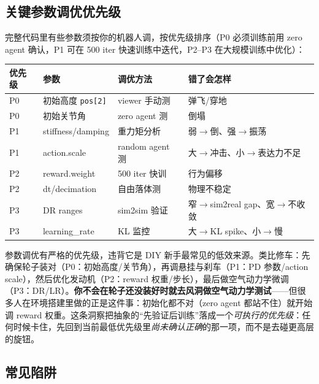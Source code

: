 \subsection{关键参数调优优先级}
\label{sec:rlmc-diy-tuning}

完整代码里有些参数须按你的机器人调，按优先级排序（P0 必须训练前用 zero agent 确认，P1 可在 500 iter 快速训练中迭代，P2--P3 在大规模训练中优化）：

\begin{center}
\small
\begin{tabular}{@{}llp{3.4cm}p{3.6cm}@{}}
\toprule
优先级 & 参数 & 调优方法 & 错了会怎样 \\
\midrule
P0 & 初始高度 \verb|pos[2]| & viewer 手动测 & 弹飞/穿地 \\
P0 & 初始关节角 & zero agent 测 & 倒塌 \\
P1 & stiffness/damping & 重力矩分析 & 弱$\to$倒、强$\to$振荡 \\
P1 & action.scale & random agent 测 & 大$\to$冲击、小$\to$表达力不足 \\
P2 & reward.weight & 500 iter 快训 & 行为偏移 \\
P2 & dt/decimation & 自由落体测 & 物理不稳定 \\
P3 & DR ranges & sim2sim 验证 & 窄$\to$sim2real gap、宽$\to$不收敛 \\
P3 & learning\_rate & KL 监控 & 大$\to$KL spike、小$\to$慢 \\
\bottomrule
\end{tabular}
\end{center}

\begin{insight}\label{ins:rlmc-diy-carfix}
参数调优有严格的优先级，违背它是 DIY 新手最常见的低效来源。类比修车：先确保轮子装对（P0：初始高度/关节角），再调悬挂与刹车（P1：PD 参数/action scale），然后优化发动机（P2：reward 权重/步长），最后做空气动力学微调（P3：DR/LR）。\textbf{你不会在轮子还没装好时就去风洞做空气动力学测试}——但很多人在环境搭建里做的正是这件事：初始化都不对（zero agent 都站不住）就开始调 reward 权重。这条洞察把抽象的“先验证后训练”落成一个\emph{可执行的优先级}：任何时候卡住，先回到当前最低优先级里\emph{尚未确认正确}的那一项，而不是去碰更高层的旋钮。
\end{insight}

\subsection{常见陷阱}
\label{sec:rlmc-diy-fullcode-pitfalls}

